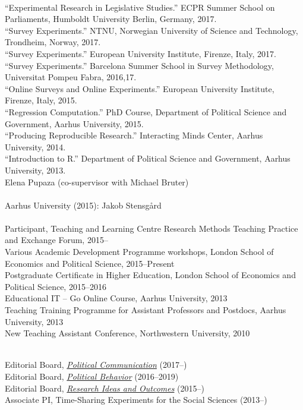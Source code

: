 \documentclass[12pt]{article}
\renewcommand{\section}[1]{\pagebreak[3]%
    \llap{\scshape\smash{\parbox[t]{\marginparwidth}{\raggedright {\color{lg}#1}}}}%
    \vspace{-\baselineskip}\par}
\newcommand{\topic}[1]{\pagebreak[3]\indent {\color{lg}{\footnotesize #1 }}\\}
\newcommand{\entry}[1]{\indent {\color{lg}\guillemotright}\hspace{2pt}#1\vspace{.25em}\\}
\begin{document}
\topic{Short courses}
	\entry{``Experimental Research in Legislative Studies.'' ECPR Summer School on Parliaments, Humboldt University Berlin, Germany, 2017.}
    \entry{``Survey Experiments.'' NTNU, Norwegian University of Science and Technology, Trondheim, Norway, 2017.}
	\entry{``Survey Experiments.'' European University Institute, Firenze, Italy, 2017.}
	\entry{``Survey Experiments.'' Barcelona Summer School in Survey Methodology, Universitat Pompeu Fabra, 2016,17.}
	\entry{``Online Surveys and Online Experiments.'' European University Institute, Firenze, Italy, 2015.}
	\entry{``Regression Computation.'' PhD Course, Department of Political Science and Government, Aarhus University, 2015.}
	\entry{``Producing Reproducible Research.'' Interacting Minds Center, Aarhus University, 2014.}
	\entry{``Introduction to R.'' Department of Political Science and Government, Aarhus University, 2013.}
    \entry{Elena Pupaza (co-supervisor with Michael Bruter)}


\topic{Master Thesis Supervision}
	\entry{Aarhus University (2015): Jakob Stensg{\aa}rd}
%

\topic{Pedagogical Training}
	\entry{Participant, Teaching and Learning Centre Research Methods Teaching Practice and Exchange Forum, 2015--}
	\entry{Various Academic Development Programme workshops, London School of Economics and Political Science, 2015--Present}
	\entry{Postgraduate Certificate in Higher Education, London School of Economics and Political Science, 2015--2016}
	\entry{Educational IT -- Go Online Course, Aarhus University, 2013}
	\entry{Teaching Training Programme for Assistant Professors and Postdocs, Aarhus University, 2013}
	\entry{New Teaching Assistant Conference, Northwestern University, 2010}

\section{Editing \&\\ Reviewing}
\topic{Editing}
	\entry{Editorial Board, \href{http://www.tandfonline.com/toc/upcp20/current}{\textit{Political Communication}} (2017--)}
    \entry{Editorial Board, \href{http://link.springer.com/journal/11109}{\textit{Political Behavior}} (2016--2019)}
	\entry{Editorial Board, \href{http://riojournal.com/}{\textit{Research Ideas and Outcomes}} (2015--)}
	\entry{Associate PI, Time-Sharing Experiments for the Social Sciences (2013--)}
\end{document}
